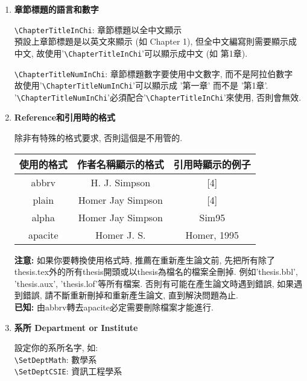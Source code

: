 \begin{enumerate}
  \item
  {
    \textbf{章節標題的語言和數字}

    \verb|\ChapterTitleInChi|:  章節標題以全中文顯示\\
    預設上章節標題是以英文來顯示 (如 Chapter 1), 但全中文編寫則需要顯示成中文, 故使用'\verb|\ChapterTitleInChi|'可以顯示成中文 (如 第1章).

    \verb|\ChapterTitleNumInChi|: 章節標題數字要使用中文數字, 而不是阿拉伯數字\\
    故使用'\verb|\ChapterTitleNumInChi|'可以顯示成 '第一章' 而不是 '第1章'. '\verb|\ChapterTitleNumInChi|'必須配合'\verb|\ChapterTitleInChi|'來使用, 否則會無效.
  } %

  \newpage
  \item
  {
    \textbf{Reference和引用時的格式}

    除非有特殊的格式要求, 否則這個是不用管的.\\

  \InsertTable
    {
        \begin{tabular}{|c|c|c|}
        \hline
        使用的格式   & 作者名稱顯示的格式         & 引用時顯示的例子    \\ \hline
        abbrv   & H. J. Simpson     & {[}4{]}     \\ \hline
        plain   & Homer Jay Simpson & {[}4{]}     \\ \hline
        alpha   & Homer Jay Simpson & Sim95       \\ \hline
        apacite & Homer J. S.       & Homer, 1995 \\ \hline
        \end{tabular}
    }

 \textbf{注意:} 如果你要轉換使用格式時, 推薦在重新產生論文前, 先把所有除了thesis.tex外的所有thesis開頭或以thesis為檔名的檔案全刪掉. 例如'thesis.bbl', 'thesis.aux', 'thesis.lof'等所有檔案.  否則有可能在產生論文時遇到錯誤, 如果遇到錯誤, 請不斷重新刪掉和重新產生論文, 直到解決問題為止.\\

 \textbf{已知:} 由abbrv轉去apacite必定需要刪除檔案才能進行.
  } %

  \newpage
  \item
  {
    \textbf{系所 Department or Institute}

    設定你的系所名字, 如:\\
    \verb|\SetDeptMath|: 數學系\\
    \verb|\SetDeptCSIE|: 資訊工程學系

}
\end{enumerate}
